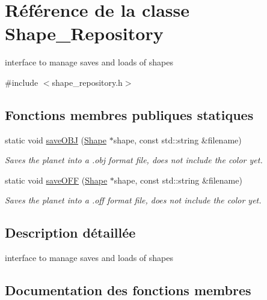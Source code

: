 \hypertarget{class_shape___repository}{}\section{Référence de la classe Shape\+\_\+\+Repository}
\label{class_shape___repository}


interface to manage saves and loads of shapes  




{\ttfamily \#include $<$shape\+\_\+repository.\+h$>$}

\subsection*{Fonctions membres publiques statiques}
\begin{DoxyCompactItemize}
\item 
static void \hyperlink{class_shape___repository_a0a0e36f8beab55be3c88e08c823819cd}{save\+O\+BJ} (\hyperlink{class_shape}{Shape} $\ast$shape, const std\+::string \&filename)
\begin{DoxyCompactList}\small\item\em Saves the planet into a .obj format file, does not include the color yet. \end{DoxyCompactList}\item 
static void \hyperlink{class_shape___repository_ad52141b6883d20084a0105355f2271b5}{save\+O\+FF} (\hyperlink{class_shape}{Shape} $\ast$shape, const std\+::string \&filename)
\begin{DoxyCompactList}\small\item\em Saves the planet into a .off format file, does not include the color yet. \end{DoxyCompactList}\end{DoxyCompactItemize}


\subsection{Description détaillée}
interface to manage saves and loads of shapes 

\subsection{Documentation des fonctions membres}
\mbox{\label{class_shape___repository_a0a0e36f8beab55be3c88e08c823819cd}} 
